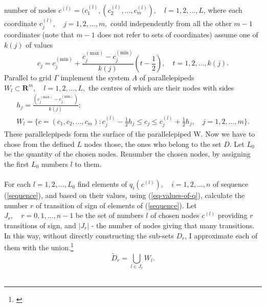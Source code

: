 number of nodes $c^{(l)} = (c_{1}^{(l)},(c_{2}^{(l)},\dots,c_{m}^{(l)}),\quad l=1,2,\dots,L$, where each coordinate $c_{j}^{(l)}, \quad j=1,2,\dots,m,$ could independently from all the other $m-1$ coordinates (note that $m-1$ does not refer to sets of coordinates) assume one of $k(j)$ of values
\begin{equation}
c_{j}=c_{j}^{(\text{min})} + \frac{c_{j}^{(\text{max})}-c_{j}^{(\text{min})}}{k(j)}(t-\frac{1}{2}), \quad t=1,2,\dots,k(j).
\end{equation}
Parallel to grid $\Gamma$ implement the system $A$ of parallelepipeds $W_{l} \subset \boldsymbol{R}^{m}, \quad l=1,2,\dots,L,$ the centres of which are their nodes with sides
\begin{gather}
h_{j} = \frac{(c_{j}^{(\text{max})}-c_{j}^{(\text{min})})}{k(j)}: \\
W_{l} = \lbrace c=(c_{1},c_{2},\dots,c_{m}):c_{j}^{(l)}-\frac{1}{2} h_{j} \leq c_{j} \leq c_{j}^{(l)}+\frac{1}{2} h_{j}, \quad j=1,2,\dots,m \rbrace .
\end{gather}
These parallelepipeds form the surface of the parallelepiped W. Now we have to chose from the defined $L$ nodes those, the ones who belong to the set $D$. Let $L_{0}$ be the quantity of the chosen nodes. Renumber the chosen nodes, by assigning the first $L_{0}$ numbers $l$ to them. \\
\\
For each $l=1,2,\dots,L_{0}$ find elements of $q_{i}(c^{(l)}), \quad i=1,2,\dots,n$ of sequence (\ref{sequence}), and based on their values, using (\ref{eq-values-of-q}), calculate the number $r$ of transition of sign of elements of (\ref{sequence}). Let $J_{r}, \quad r=0,1,\dots,n-1$ be the set of numbers $l$ of chosen nodes $c^{(l)}$ providing $r$ transitions of sign, and $|J_{r}|$ - the number of nodes giving that many transitions. In this way, without directly constructing the sub-sets $D_{r}$, I approximate each of them with the union.\footnote{\cite{smith_eggen_andre_2015}}
\begin{equation}
\tilde{D}_{r} = \bigcup_{l \in J_{r}} W_{l}. \tag*{(\theequation)\protect\footnotemark}
\end{equation}
\\
